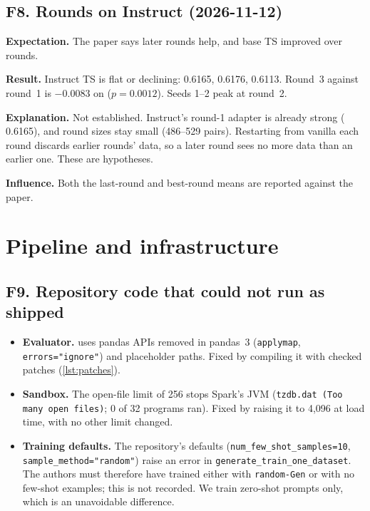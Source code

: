 \subsection{F8. Rounds on Instruct (2026-11-12)}
\begin{failbox}{}
\textbf{Expectation.} The paper says later rounds help, and base TS improved over rounds.

\textbf{Result.} Instruct TS is flat or declining: \ZSiv{} 0.6165, 0.6176, 0.6113. Round~3 against round~1 is
$-0.0083$ on \Mviii{} ($p=0.0012$). Seeds 1--2 peak at round~2.

\textbf{Explanation.} Not established. Instruct's round-1 adapter is already strong (\ZSiv{} 0.6165), and round sizes
stay small (486--529 pairs). Restarting from vanilla each round discards earlier rounds' data, so a later round sees
no more data than an earlier one. These are hypotheses.

\textbf{Influence.} Both the last-round and best-round means are reported against the paper.
\end{failbox}

\section{Pipeline and infrastructure}

\subsection{F9. Repository code that could not run as shipped}\label{sec:fail-repo}
\begin{failbox}{}
\begin{itemize}
\item \textbf{Evaluator.}  uses pandas APIs removed in pandas~3 (\texttt{applymap},
\texttt{errors="ignore"}) and placeholder paths. Fixed by compiling it with checked patches (\cref{lst:patches}).
\item \textbf{Sandbox.} The open-file limit of 256 stops Spark's JVM (\texttt{tzdb.dat (Too many open files)}; 0 of
32 programs ran). Fixed by raising it to 4,096 at load time, with no other limit changed.
\item \textbf{Training defaults.} The repository's defaults (\texttt{num\_few\_shot\_samples=10},
\texttt{sample\_method="random"}) raise an error in \texttt{generate\_train\_one\_dataset}. The authors must
therefore have trained either with \texttt{random-Gen} or with no few-shot examples; this is not recorded. We train
zero-shot prompts only, which is an unavoidable difference.
\end{itemize}
\end{failbox}

